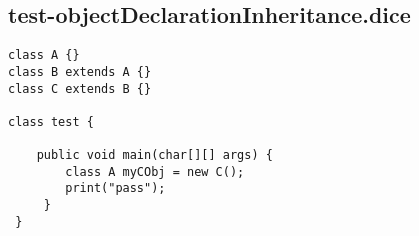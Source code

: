 \subsection{test-objectDeclarationInheritance.dice}
\begin{verbatim}
class A {}
class B extends A {}
class C extends B {}

class test {

	public void main(char[][] args) {
		class A myCObj = new C();
		print("pass");
	 }
 }
\end{verbatim}